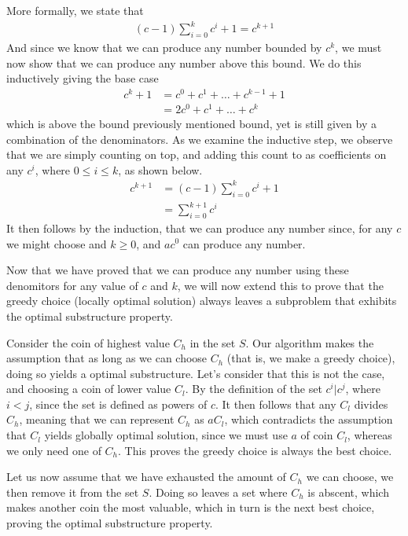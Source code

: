 \documentclass[11pt,english]{article}
\begin{document}
More formally, we state that
\begin{align}
	(c - 1)\sum_{i=0}^{k} c^i + 1 = c^{k+1}
\end{align}
And since we know that we can produce any number bounded by $c^k$, we must
now show that we can produce any number above this bound. We do this
inductively giving the base case
\begin{align}
	c^k + 1 &= c^0 + c^1 + \dots + c^{k-1} + 1\\
	&= 2c^0 + c^1 + \dots + c^k
\end{align}
which is above the bound previously mentioned bound, yet is still given by a
combination of the denominators. As we examine the inductive step, we observe
that we are simply counting on top, and adding this count to as coefficients
on any $c^i$, where $0 \leq i \leq k$, as shown below.
\begin{align}
	c^{k+1} &= (c - 1)\sum_{i=0}^{k}{c^i} + 1\\
	&= \sum_{i=0}^{k+1}{c^i} \nonumber
\end{align}
It then follows by the induction, that we can produce any number since, for
any $c$ we might choose and $k \geq 0$, and $ac^0$ can produce any number.

Now that we have proved that we can produce any number using these denomitors
for any value of $c$ and $k$, we will now extend this to prove that the greedy
choice (locally optimal solution) always leaves a subproblem that exhibits the
optimal substructure property.

Consider the coin of highest value $C_h$ in the set $S$. Our algorithm makes
the assumption that as long as we can choose $C_h$ (that is, we make a greedy
choice), doing so yields a optimal substructure. Let's consider that this is
not the case, and choosing a coin of lower value $C_l$. By the definition of
the set $c^i | c^j$, where $i < j$, since the set is defined as powers of $c$.
It then follows that any $C_l$ divides $C_h$, meaning that we can represent
$C_h$ as $aC_l$, which contradicts the assumption that $C_l$ yields globally
optimal solution, since we must use $a$ of coin $C_l$, whereas we only need
one of $C_h$. This proves the greedy choice is always the best choice.

Let us now assume that we have exhausted the amount of $C_h$ we can choose,
we then remove it from the set $S$. Doing so leaves a set where $C_h$ is
abscent, which makes another coin the most valuable, which in turn is the
next best choice, proving the optimal substructure property.
\end{document}

